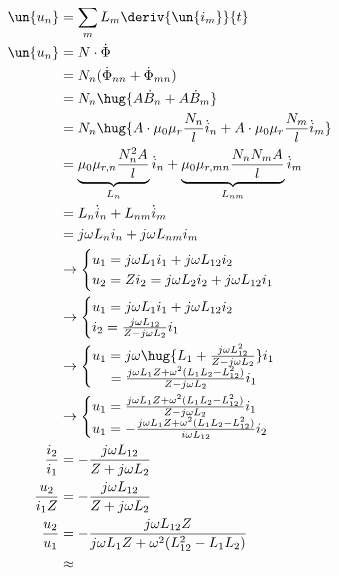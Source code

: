 \documentclass[11pt]{article}
\begin{document}
\subsection{}
\begin{align*}
    \un {u_n} &= \sum_m L_m \deriv{\un{i_m}}{t}\\
    \un {u_n} &= N \cdot \dot \Phi\\
    &= N_n(\dot \Phi_{nn} + \dot \Phi_{mn})\\
    &= N_n\hug{A \dot B_{n} + A \dot B_{m}}\\
    &= N_n\hug{A \cdot \mu_0 \mu_r \frac{N_n}{l} \dot i_n + A \cdot \mu_0 \mu_r \frac{N_m}{l} \dot i_m}\\
    &= \underbrace{\mu_0 \mu_{r,n} \frac{N_n^2 A }{l}}_{L_n} \dot i_n + \underbrace{\mu_0 \mu_{r,mn} \frac{N_n N_m A}{l}}_{L_{nm}} \dot i_m\\
    &= L_n\dot i_n + L_{nm} \dot i_m\\
    &= j \omega L_n i_n + j \omega L_{nm}i_m\\
    &\rightarrow\begin{cases}
        u_1 = j \omega L_1 i_1 + j \omega L_{12} i_2\\
        u_2 = Z i_2 = j \omega L_2 i_2 + j \omega L_{12} i_1\\
    \end{cases}\\
    &\rightarrow\begin{cases}
        u_1 = j \omega L_1 i_1 + j \omega L_{12} i_2\\
        i_2 = \frac{j \omega L_{12} }{ Z - j \omega L_2}i_1\\
    \end{cases}\\
    &\rightarrow\begin{cases}
        u_1 = j \omega  \hug{L_1 +  \frac{j \omega L_{12}^2 }{ Z - j \omega L_2}}i_1\\
        \ \ \ \ = \frac{j \omega L_1 Z + \omega^2 (L_1 L_2 - L_{12}^2)}{Z - j \omega L_2} i_1\\
    \end{cases}\\
    &\rightarrow\begin{cases}
        u_1 = \frac{j \omega L_1 Z + \omega^2 (L_1 L_2 - L_{12}^2)}{Z - j \omega L_2} i_1\\
        u_1 = - \frac{j \omega L_1 Z + \omega^2 (L_1 L_2 - L_{12}^2)}{i\omega L_{12}} i_2
    \end{cases}\\
    \frac{i_2}{i_1} &=-  \frac{j\omega L_{12}}{Z + j \omega L_2}\\
    \frac{u_2}{i_1 Z} &=-  \frac{j\omega L_{12}}{Z + j \omega L_2}\\
    \frac{u_2}{u_1} &= -\frac{j\omega L_{12} Z}{j\omega L_1 Z + \omega^2 (L_{12}^2-L_1 L_2)}\\
    &\approx 
\end{align*}
\end{document}
